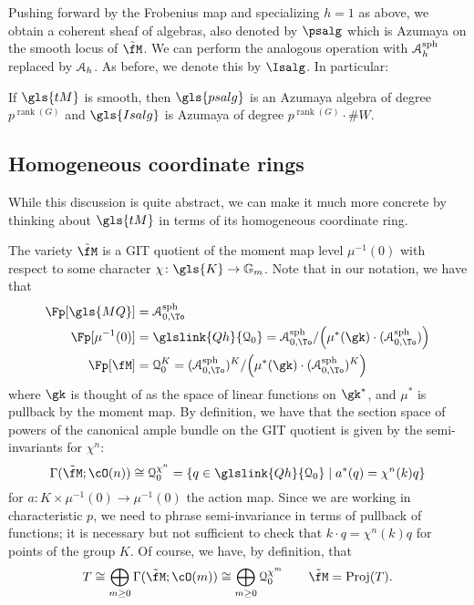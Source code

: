 Pushing forward by the
Frobenius map and specializing $h=1$ as above, we obtain a coherent
sheaf of algebras, also denoted by $\psalg$ which is Azumaya on the smooth locus of
$\tilde{\fM}$.  We can perform the analogous operation with $\EuScript{A}_h ^{\operatorname{sph}}$ replaced by  $\EuScript{A}_h$.  As before, we denote this by $\Isalg$.
In particular: \begin{lemma}
  If $\gls{tM}$ is smooth, then $\gls{psalg}$ is an Azumaya algebra of degree $p^{\operatorname{rank}(G)}$ and $\gls{Isalg}$ is Azumaya of degree $p^{\operatorname{rank}(G)}\cdot \#W$.  
\end{lemma}



\subsection{Homogeneous coordinate rings}  
While this discussion is quite abstract, we can make it much more concrete by thinking about $\gls{tM}$ in terms of its homogeneous coordinate ring.

The variety $\tilde{\fM}$ is a GIT quotient of the moment map level $\mu^{-1}(0)$ with respect to some character $\chi\colon \gls{K}\to \mathbb{G}_m$. Note that in our notation, we have that 
  \begin{align*}
    \Fp[\gls{MQ}]&=\EuScript{A}_{0,\To}^{\operatorname{sph}}\\
    \Fp[\mu^{-1}(0)]&=\glslink{Qh}{\EuScript{Q}_0}=\EuScript{A}_{0,\To}^{\operatorname{sph}}/\Big(\mu^*(\gk)\cdot(\EuScript{A}_{0,\To}^{\operatorname{sph}})\Big)\\
    \Fp[\fM]&=\EuScript{Q}_0^K= (\EuScript{A}_{0,\To}^{\operatorname{sph}})^K/\Big(\mu^*(\gk)\cdot(\EuScript{A}_{0,\To}^{\operatorname{sph}})^K\Big)
  \end{align*}
  where $\gk$ is thought of as the space of linear functions on $\gk^*$, and $\mu^*$ is pullback by the moment map.    
  By definition, we have that the section space of powers of the canonical ample bundle on the GIT quotient is given by the semi-invariants for $\chi^n$:
  \begin{equation*}
    \Gamma(\tilde{\fM};\cO(n))\cong \EuScript{Q}_0^{\chi^n} =\{q\in \glslink{Qh}{\EuScript{Q}_0}\mid a^*( q)=\chi^n(k)q \} 
  \end{equation*}
  for $a\colon K\times \mu^{-1}(0)\to \mu^{-1}(0) $ the action map. Since we are working in characteristic $p$, we need to phrase semi-invariance in terms of pullback of functions; it is necessary but not sufficient to check that $k\cdot q=\chi^n(k)q$ for points of the group $K$.  Of course, we have, by definition, that
  \begin{equation}
T\cong \bigoplus_{m\geq 0}\Gamma(\tilde{\fM};\cO(m))\cong \bigoplus_{m\geq 0}\EuScript{Q}_0^{\chi^m}\qquad \tilde{\fM}=\operatorname{Proj}(T).\label{eq:proj-coord}
\end{equation}

